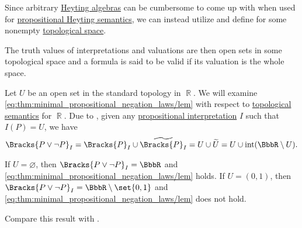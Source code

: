 \begin{definition}\label{def:propositional_topological_semantics}
  Since arbitrary \hyperref[def:heyting_algebra]{Heyting algebras} can be cumbersome to come up with when used for \hyperref[def:propositional_heyting_algebra_semantics]{propositional Heyting semantics}, we can instead utilize  and define  for some nonempty \hyperref[def:topological_space]{topological space}.

  The truth values of interpretations and valuations are then open sets in some topological space and a formula is said to be valid if its valuation is the whole space.
\end{definition}

\begin{example}\label{ex:topological_semantics_lem_counterexample}
  Let \( U \) be an open set in the standard topology in \( \BbbR \). We will examine \eqref{eq:thm:minimal_propositional_negation_laws/lem} with respect to \hyperref[def:propositional_topological_semantics]{topological semantics} for \( \BbbR \). Due to , given any \hyperref[def:propositional_valuation]{propositional interpretation} \( I \) such that \( I(P) = U \), we have
  \begin{equation*}
    \Bracks{P \vee \neg P}_I
    =
    \Bracks{P}_I \cup \widetilde{\Bracks{P}_I}
    =
    U \cup \widetilde{U}
    =
    U \cup \Int(\BbbR \setminus U).
  \end{equation*}

  If \( U = \varnothing \), then \( \Bracks{P \vee \neg P}_I = \BbbR \) and \eqref{eq:thm:minimal_propositional_negation_laws/lem} holds. If \( U = (0, 1) \), then \( \Bracks{P \vee \neg P}_I = \BbbR \setminus \set{ 0, 1 } \) and \eqref{eq:thm:minimal_propositional_negation_laws/lem} does not hold.

  Compare this result with .
\end{example}

